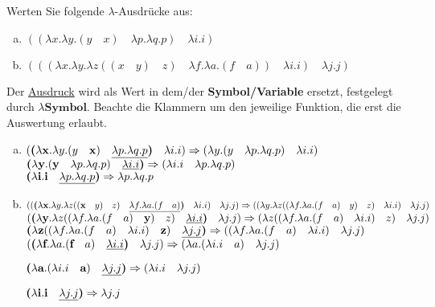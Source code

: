 \begin{card}
	Werten Sie folgende $\lambda$-Ausdrücke aus:
	\begin{enumerate}[a)]
	\item $((\lambda x.\lambda y.(y \quad x) \quad \lambda p.\lambda q.p) \quad \lambda i.i)$
	\item $(((\lambda x.\lambda y.\lambda z((x \quad y) \quad z) \quad \lambda f.\lambda a.(f \quad a)) \quad \lambda i.i) \quad\lambda j.j)$
	\end{enumerate}
	\hr
	Der \underline{Ausdruck} wird als Wert in dem/der \textbf{Symbol/Variable} ersetzt, festgelegt durch $\lambda\mathbf{Symbol}$. Beachte die Klammern um den jeweilige Funktion, die erst die Auswertung erlaubt.
	\begin{enumerate}[a)]
	\item
	$(\textbf{(}\lambda \mathbf{x}.\lambda y.(y \quad \mathbf{x}) \quad \uline{\lambda p.\lambda q.p}\textbf{)} \quad \lambda i.i) 
	\Rightarrow 
	(\lambda y.(y \quad \lambda p.\lambda q.p) \quad \lambda i.i)$\\
	
	$\textbf{(}\lambda \mathbf{y}.(\mathbf{y} \quad \lambda p.\lambda q.p) \quad \uline{\lambda i.i}\textbf{)}
	\Rightarrow
	(\lambda i.i \quad \lambda p.\lambda q.p)$\\
	
	$\textbf{(}\lambda \mathbf{i}.\mathbf{i} \quad \uline{\lambda p.\lambda q.p}\textbf{)}
	\Rightarrow
	\lambda p.\lambda q.p$
	\item 
	$((\textbf{(}\lambda \mathbf{x}.\lambda y.\lambda z((\mathbf{x} \quad y) \quad z) \quad \uline{\lambda f.\lambda a.(f \quad a)}\textbf{)} \quad \lambda i.i) \quad \lambda j.j) \Rightarrow
	((\lambda y.\lambda z((\lambda f.\lambda a.(f \quad a) \quad y) \quad z) \quad \lambda i.i) \quad \lambda j.j)$
	\vfill
	$(\textbf{(}\lambda \textbf{y}.\lambda z((\lambda f.\lambda a.(f \quad a) \quad \textbf{y}) \quad z) \quad \uline{\lambda i.i} \textbf{)} \quad \lambda j.j) \Rightarrow 
	(\lambda z((\lambda f.\lambda a.(f \quad a) \quad \lambda i.i) \quad z) \quad \lambda j.j)$
	\vfill
	$\textbf{(}\lambda \textbf{z}((\lambda f.\lambda a.(f \quad a) \quad \lambda i.i) \quad \textbf{z}) \quad \uline{\lambda j.j} \textbf{)} \Rightarrow 
	((\lambda f.\lambda a.(f \quad a) \quad \lambda i.i) \quad \lambda j.j)$
	\vfill
	$(\textbf{(}\lambda \textbf{f}.\lambda a.(\textbf{f} \quad a) \quad \uline{\lambda i.i}\textbf{)} \quad \lambda j.j) \Rightarrow
	(\lambda a.(\lambda i.i \quad a) \quad \lambda j.j)$
	
	$\textbf{(}\lambda \textbf{a}.(\lambda i.i \quad \textbf{a}) \quad \uline{\lambda j.j}\textbf{)} \Rightarrow
	(\lambda i.i \quad \lambda j.j)$
	
	$\textbf{(}\lambda \textbf{i}.\textbf{i} \quad \uline{\lambda j.j}\textbf{)} \Rightarrow
	\lambda j.j$
	\end{enumerate}
\end{card}


